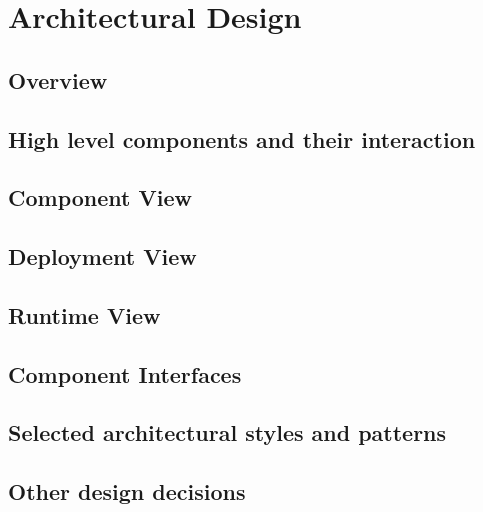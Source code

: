\section{Architectural Design}
\subsection{Overview}
\subsection{High level components and their interaction}
\subsection{Component View}
\subsection{Deployment View}
\subsection{Runtime View}
\subsection{Component Interfaces}
\subsection{Selected architectural styles and patterns}
\subsection{Other design decisions}